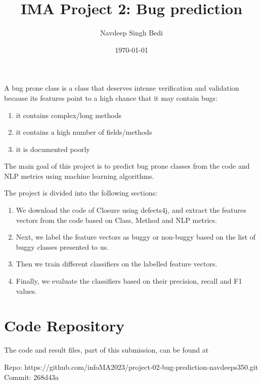 \documentclass{article}
\title{IMA Project 2: Bug prediction}
\author{Navdeep Singh Bedi}
\date{\today}
\begin{document}
\setcounter{section}{-1}

\maketitle

A bug prone class is a class that deserves intense verification and validation
because its features point to a high chance that it may contain bugs:
\begin{enumerate}
    \item it contains complex/long methods
    \item it contains a high number of fields/methods
    \item it is documented poorly
\end{enumerate}
The main goal of this project is to predict bug prone classes from the code and NLP metrics
using machine learning algorithms.

The project is divided into the following sections:
\begin{enumerate}
    \item We download the code of Closure using defects4j, 
    and extract the features vectors from the code based on Class, Method and NLP metrics.
    \item Next, we label the feature vectors as buggy or non-buggy based on the list of buggy classes presented to us.
    \item Then we train different classifiers on the labelled feature vectors.
    \item Finally, we evaluate the classifiers based on their precision, recall and F1 values.
\end{enumerate}
\section{Code Repository}

The code and result files, part of this submission, can be found at

\begin{center}
    Repo: https://github.com/infoMA2023/project-02-bug-prediction-navdeeps350.git \\
    Commit: 268d43a
\end{center}
\end{document}
